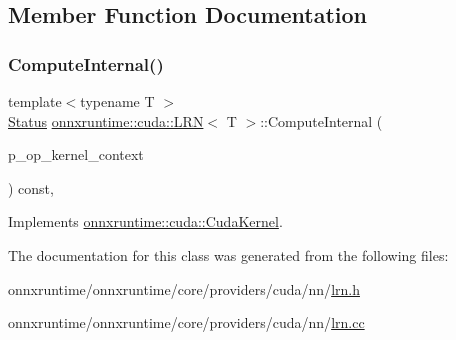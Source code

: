 \subsection{Member Function Documentation}
\mbox{\label{classonnxruntime_1_1cuda_1_1LRN_a89f6b059658b713b1e3f7a05ddf19712}} 
\subsubsection{\texorpdfstring{Compute\+Internal()}{ComputeInternal()}}
{\footnotesize\ttfamily template$<$typename T $>$ \\
\mbox{\hyperlink{classonnxruntime_1_1common_1_1Status}{Status}} \mbox{\hyperlink{classonnxruntime_1_1cuda_1_1LRN}{onnxruntime\+::cuda\+::\+L\+RN}}$<$ T $>$\+::Compute\+Internal (\begin{DoxyParamCaption}\item[{\mbox{\hyperlink{classonnxruntime_1_1OpKernelContext}{Op\+Kernel\+Context}} $\ast$}]{p\+\_\+op\+\_\+kernel\+\_\+context }\end{DoxyParamCaption}) const\hspace{0.3cm}{\ttfamily [override]}, {\ttfamily [virtual]}}



Implements \mbox{\hyperlink{classonnxruntime_1_1cuda_1_1CudaKernel_aca7af04ae448017d6023d30bba231ebb}{onnxruntime\+::cuda\+::\+Cuda\+Kernel}}.



The documentation for this class was generated from the following files\+:\begin{DoxyCompactItemize}
\item 
onnxruntime/onnxruntime/core/providers/cuda/nn/\mbox{\hyperlink{cuda_2nn_2lrn_8h}{lrn.\+h}}\item 
onnxruntime/onnxruntime/core/providers/cuda/nn/\mbox{\hyperlink{cuda_2nn_2lrn_8cc}{lrn.\+cc}}\end{DoxyCompactItemize}
